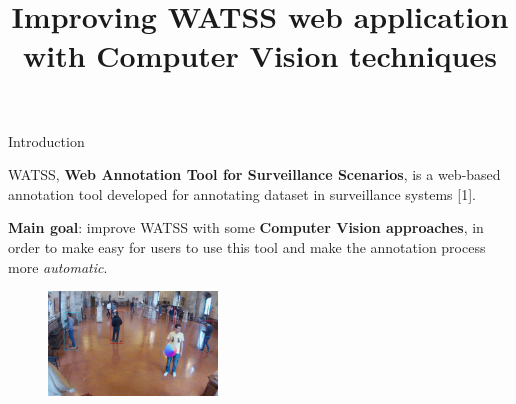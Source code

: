 \documentclass{beamer}
\author{}
\title{\huge Improving WATSS web application with Computer Vision techniques}
\date{}
\begin{document}
\titlepageframe

\begin{tframe}{Introduction}

WATSS, \textbf{Web Annotation Tool for Surveillance Scenarios}, is a web-based annotation tool developed for annotating dataset in surveillance systems [1].

\vspace{0.3cm}

\textbf{Main goal}: improve WATSS with some \textbf{Computer Vision approaches}, in order to make easy for users to use this tool and make the annotation process more \emph{automatic}.

\begin{figure}[h]
\begin{center}
\includegraphics[width=0.4\textwidth]{images/frame.jpg}
\end{center}
\label{fig:mainframe}
\end{figure}

\end{tframe}
\end{document}
